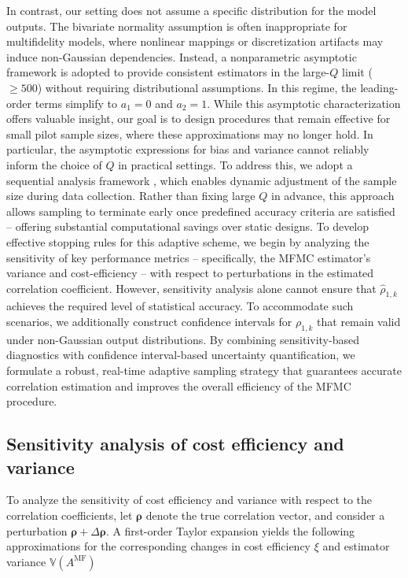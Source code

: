 In contrast, our setting does not assume a specific distribution for the model outputs. The bivariate normality assumption is often inappropriate for multifidelity models, where nonlinear mappings or discretization artifacts may induce non-Gaussian dependencies. Instead, a nonparametric asymptotic framework \cite{Og:2006, Pi:1937} is adopted to provide consistent estimators in the large-$Q$ limit ($\ge 500$) without requiring distributional assumptions. In this regime, the leading-order terms simplify to $a_1 = 0$ and $a_2 = 1$. While this asymptotic characterization offers valuable insight, our goal is to design procedures that remain effective for small pilot sample sizes, where these approximations may no longer hold. In particular, the asymptotic expressions for bias and variance cannot reliably inform the choice of $Q$ in practical settings. To address this, we adopt a sequential analysis framework \cite{La:2001,Wa:1947}, which enables dynamic adjustment of the sample size during data collection. Rather than fixing large $Q$ in advance, this approach allows sampling to terminate early once predefined accuracy criteria are satisfied -- offering substantial computational savings over static designs. To develop effective stopping rules for this adaptive scheme, we begin by analyzing the sensitivity of key performance metrics -- specifically, the MFMC estimator’s variance and cost-efficiency -- with respect to perturbations in the estimated correlation coefficient. However, sensitivity analysis alone cannot ensure that $\widehat \rho_{1,k}$ achieves the required level of statistical accuracy.  To accommodate such scenarios, we additionally construct confidence intervals for $\rho_{1,k}$ that remain valid under non-Gaussian output distributions. By combining sensitivity-based diagnostics with confidence interval-based uncertainty quantification, we formulate a robust, real-time adaptive sampling strategy that guarantees accurate correlation estimation and improves the overall efficiency of the MFMC procedure.





\subsection{Sensitivity analysis of cost efficiency and variance}
To analyze the sensitivity of cost efficiency and variance with respect to the correlation coefficients, let $\boldsymbol{\rho}$ denote the true correlation vector, and consider a perturbation $\boldsymbol{\rho} + \Delta \boldsymbol{\rho}$. A first-order Taylor expansion yields the following approximations for the corresponding changes in cost efficiency $\xi$ and estimator variance $\mathbb{V}(A^{\text{MF}})$


